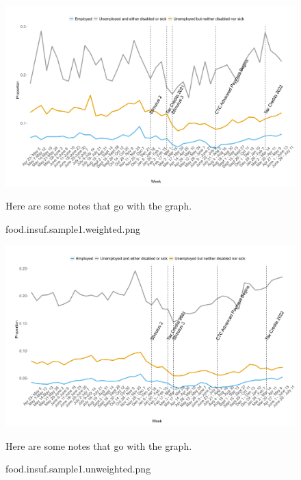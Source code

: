 \documentclass[12pt]{article}
\begin{document}
\begin{figure}[!ht]\label{food.insuf.sample1.weighted.png}
\caption{food.insuf.sample1.weighted.png}
\centering
\includegraphics[scale=0.3]{food.insuf.sample1.weighted.png}
\medskip 
\begin{minipage}{0.65\textwidth} 
{\footnotesize Here are some notes that go with the graph.  \par}
\end{minipage}
\end{figure}


\begin{figure}[!ht]\label{food.insuf.sample1.unweighted.png}
\caption{food.insuf.sample1.unweighted.png}
\centering
\includegraphics[scale=0.3]{food.insuf.sample1.unweighted.png}
\medskip 
\begin{minipage}{0.65\textwidth} 
{\footnotesize Here are some notes that go with the graph.  \par}
\end{minipage}
\end{figure}
\end{document}
